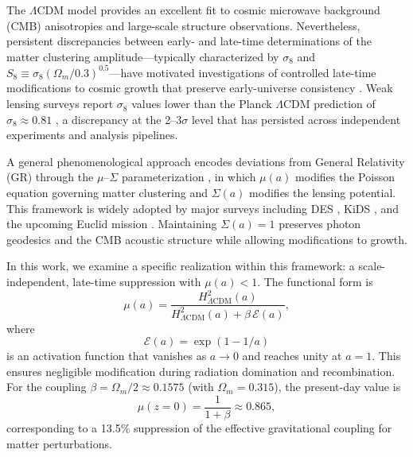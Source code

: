 \documentclass[11pt]{article}
\begin{document}
The $\Lambda$CDM model provides an excellent fit to cosmic microwave background (CMB) anisotropies \citep{Planck2018VI} and large-scale structure observations.
Nevertheless, persistent discrepancies between early- and late-time determinations of the matter clustering amplitude---typically characterized by $\sigma_8$ and $S_8 \equiv \sigma_8 (\Omega_m / 0.3)^{0.5}$---have motivated investigations of controlled late-time modifications to cosmic growth that preserve early-universe consistency \citep{DESY3,KiDS1000,HSC}.
Weak lensing surveys report $\sigma_8$ values lower than the Planck $\Lambda$CDM prediction of $\sigma_8 \approx 0.81$ \citep{Planck2018VI}, a discrepancy at the 2--3$\sigma$ level that has persisted across independent experiments and analysis pipelines.

A general phenomenological approach encodes deviations from General Relativity (GR) through the $\mu$--$\Sigma$ parameterization \citep{BeanTangmatitham2010,Daniel2010,PogosianSilvestri2016}, in which $\mu(a)$ modifies the Poisson equation governing matter clustering and $\Sigma(a)$ modifies the lensing potential.
This framework is widely adopted by major surveys including DES \citep{DESY3}, KiDS \citep{KiDS1000}, and the upcoming Euclid mission \citep{EuclidMG2025}.
Maintaining $\Sigma(a) = 1$ preserves photon geodesics and the CMB acoustic structure while allowing modifications to growth.

In this work, we examine a specific realization within this framework: a scale-independent, late-time suppression with $\mu(a) < 1$.
The functional form is
\begin{equation}
\mu(a) = \frac{H^2_{\Lambda\mathrm{CDM}}(a)}{H^2_{\Lambda\mathrm{CDM}}(a) + \beta\,\mathcal{E}(a)},
\label{eq:mu_exact}
\end{equation}
where
\begin{equation}
\mathcal{E}(a) = \exp(1 - 1/a)
\label{eq:activation}
\end{equation}
is an activation function that vanishes as $a \to 0$ and reaches unity at $a = 1$.
This ensures negligible modification during radiation domination and recombination.
For the coupling $\beta = \Omega_m / 2 \approx 0.1575$ (with $\Omega_m = 0.315$), the present-day value is
\begin{equation}
\mu(z{=}0) = \frac{1}{1 + \beta} \approx 0.865,
\label{eq:mu_today}
\end{equation}
corresponding to a 13.5\% suppression of the effective gravitational coupling for matter perturbations.
\end{document}

